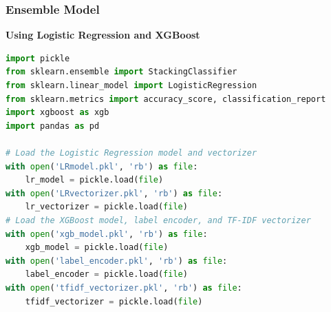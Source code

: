 \subsubsection{Ensemble Model}
\noindent
\textbf{Using Logistic Regression and XGBoost}

\begin{tcolorbox}[colback=gray!5!white, colframe=gray!80!black, boxrule=0.5pt, title=Model Loading and Preprocessing]
    \begin{lstlisting}[language=Python]
import pickle
from sklearn.ensemble import StackingClassifier
from sklearn.linear_model import LogisticRegression
from sklearn.metrics import accuracy_score, classification_report
import xgboost as xgb
import pandas as pd

# Load the Logistic Regression model and vectorizer
with open('LRmodel.pkl', 'rb') as file:
    lr_model = pickle.load(file)
with open('LRvectorizer.pkl', 'rb') as file:
    lr_vectorizer = pickle.load(file)
# Load the XGBoost model, label encoder, and TF-IDF vectorizer
with open('xgb_model.pkl', 'rb') as file:
    xgb_model = pickle.load(file)
with open('label_encoder.pkl', 'rb') as file:
    label_encoder = pickle.load(file)
with open('tfidf_vectorizer.pkl', 'rb') as file:
    tfidf_vectorizer = pickle.load(file)
    \end{lstlisting}
\end{tcolorbox}


